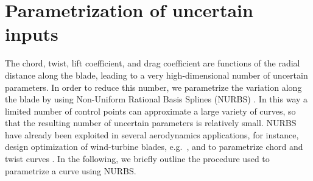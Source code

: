 \section{Parametrization of uncertain inputs}\label{sec:parameterization}

The chord, twist, lift coefficient, and drag coefficient are functions of the radial distance along the blade, leading to a very high-dimensional number of uncertain parameters. In order to reduce this number, we parametrize the variation along the blade by using Non-Uniform Rational Basis Splines (NURBS) \cite{rogers2000}. In this way a limited number of control points can approximate a large variety of curves, so that the resulting number of uncertain parameters is relatively small. 
NURBS have already been exploited in several aerodynamics applications, for instance, design optimization of wind-turbine blades, e.g.~\cite{Bottasso2014,Ribeiro2012}, and to parametrize chord and twist curves \cite{Echeverria2017}. In the following, we briefly outline the procedure used to parametrize a curve using NURBS.


